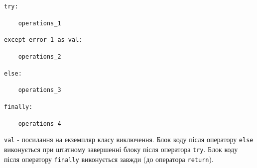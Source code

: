 \begin{frame}
\texttt{try:}

\texttt{~~~~operations\_1}

\texttt{except error\_1 as val:}

\texttt{~~~~operations\_2}

\texttt{else:}

\texttt{~~~~operations\_3}

\texttt{finally:}

\texttt{~~~~operations\_4}

\texttt{val} - посилання на екземпляр класу виключення. Блок коду після оператору \texttt{else} виконується при штатному завершенні блоку після оператора \texttt{try}. Блок коду після оператору \texttt{finally} виконується завжди (до оператора \texttt{return}).
\end{frame}
